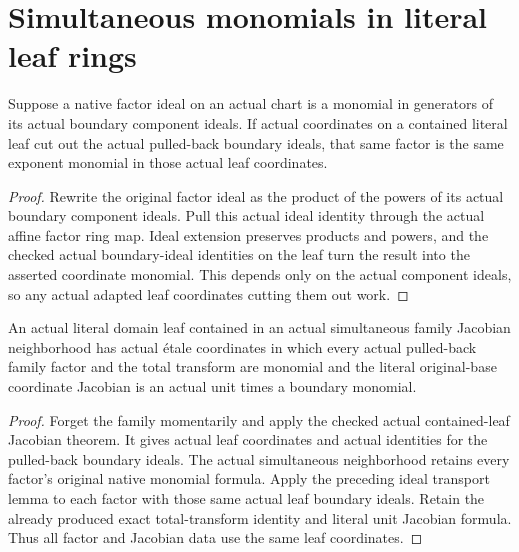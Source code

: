 \section{Simultaneous monomials in literal leaf rings}

\begin{lemma}\label{lem:sc0-family-leaf-factor-transport}
\leanok
{}
Suppose a native factor ideal on an actual chart is a monomial in generators
of its actual boundary component ideals. If actual coordinates on a contained
literal leaf cut out the actual pulled-back boundary ideals, that same factor
is the same exponent monomial in those actual leaf coordinates.
\end{lemma}
\begin{proof}
Rewrite the original factor ideal as the product of the powers of its actual
boundary component ideals. Pull this actual ideal identity through the
actual affine factor ring map. Ideal extension preserves products and powers,
and the checked actual boundary-ideal identities on the leaf turn the result
into the asserted coordinate monomial. This depends only on the actual
component ideals, so any actual adapted leaf coordinates cutting them out work.
\end{proof}

\begin{theorem}\label{thm:sc0-family-leaf-jacobian-monomials}
\leanok
{}
An actual literal domain leaf contained in an actual simultaneous family
Jacobian neighborhood has actual \'etale coordinates in which every actual
pulled-back family factor and the total transform are monomial and the literal
original-base coordinate Jacobian is an actual unit times a boundary monomial.
\end{theorem}
\begin{proof}
Forget the family momentarily and apply the checked actual contained-leaf
Jacobian theorem. It gives actual leaf coordinates and actual identities for
the pulled-back boundary ideals. The actual simultaneous neighborhood retains
every factor's original native monomial formula. Apply the preceding ideal
transport lemma to each factor with those same actual leaf boundary ideals.
Retain the already produced exact total-transform identity and literal unit
Jacobian formula. Thus all factor and Jacobian data use the same leaf coordinates.
\end{proof}
